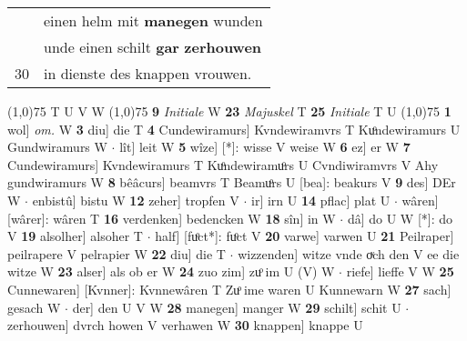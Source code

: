 \documentclass[8pt,a4paper,notitlepage]{article}
\begin{document}
\begin{table}[ht]
\begin{minipage}[t]{0.5\linewidth}
\begin{tabular}{rl}
 & einen helm mit \textbf{manegen} wunden\\ 
 & unde einen schilt \textbf{gar} \textbf{zerhouwen}\\ 
30 & in dienste des knappen vrouwen.\\ 
\end{tabular}
\scriptsize
\line(1,0){75} \newline
T U V W \newline
\line(1,0){75} \newline
\textbf{9} \textit{Initiale} W  \textbf{23} \textit{Majuskel} T  \textbf{25} \textit{Initiale} T U  \newline
\line(1,0){75} \newline
\textbf{1} wol] \textit{om.} W \textbf{3} diu] die T \textbf{4} Cundewiramurs] Kvndewiramvrs T Kuͦndewiramurs U Gundwiramurs W  $\cdot$ lît] leit W \textbf{5} wîze] [*]: wisse V weise W \textbf{6} ez] er W \textbf{7} Cundewiramurs] Kvndewiramurs T Kuͦndewiramuͦrs U Cvndiwiramvrs V Ahy gundwiramurs W \textbf{8} bêâcurs] beamvrs T Beamuͦrs U [bea]: beakurs V \textbf{9} des] DEr W  $\cdot$ enbistû] bistu W \textbf{12} zeher] tropfen V  $\cdot$ ir] irn U \textbf{14} pflac] plat U  $\cdot$ wâren] [wârer]: wâren T \textbf{16} verdenken] bedencken W \textbf{18} sîn] in W  $\cdot$ dâ] do U W [*]: do V \textbf{19} alsolher] alsoher T  $\cdot$ half] [fuͦct*]: fuͦct V \textbf{20} varwe] varwen U \textbf{21} Peilraper] peilrapere V pelrapier W \textbf{22} diu] die T  $\cdot$ wizzenden] witze vnde oͮch den V ee die witze W \textbf{23} alser] als ob er W \textbf{24} zuo zim] zuͦ im U (V) W  $\cdot$ riefe] lieffe V W \textbf{25} Cunnewaren] [Kvnner]: Kvnnewâren T Zuͦ ime waren U Kunnewarn W \textbf{27} sach] gesach W  $\cdot$ der] den U V W \textbf{28} manegen] manger W \textbf{29} schilt] schit U  $\cdot$ zerhouwen] dvrch howen V verhawen W \textbf{30} knappen] knappe U \newline
\end{minipage}
\end{table}
\end{document}
